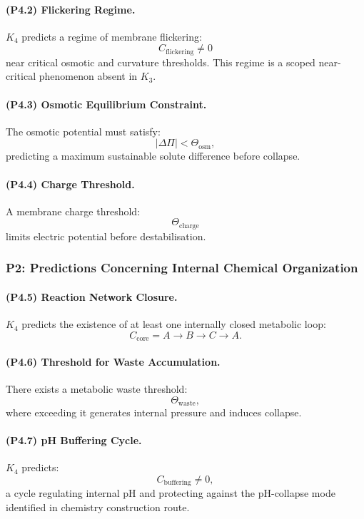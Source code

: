 \paragraph{(P4.2) Flickering Regime.}
$K_4$ predicts a regime of membrane flickering:
\[
C_{\mathrm{flickering}} \neq 0
\]
near critical osmotic and curvature thresholds.
This regime is a scoped near-critical phenomenon absent in $K_3$.

\paragraph{(P4.3) Osmotic Equilibrium Constraint.}
The osmotic potential must satisfy:
\[
|\Delta \Pi| < \Theta_{\mathrm{osm}},
\]
predicting a maximum sustainable solute difference before collapse.

\paragraph{(P4.4) Charge Threshold.}
A membrane charge threshold:
\[
\Theta_{\mathrm{charge}}
\]
limits electric potential before destabilisation.

\subsubsection{P2: Predictions Concerning Internal Chemical Organization}

\paragraph{(P4.5) Reaction Network Closure.}
$K_4$ predicts the existence of at least one internally closed metabolic loop:
\[
C_{\mathrm{core}} = A \to B \to C \to A.
\]

\paragraph{(P4.6) Threshold for Waste Accumulation.}
There exists a metabolic waste threshold:
\[
\Theta_{\mathrm{waste}},
\]
where exceeding it generates internal pressure and induces collapse.

\paragraph{(P4.7) pH Buffering Cycle.}
$K_4$ predicts:
\[
C_{\mathrm{buffering}} \neq 0,
\]
a cycle regulating internal pH and protecting against the pH-collapse mode
identified in chemistry construction route.

